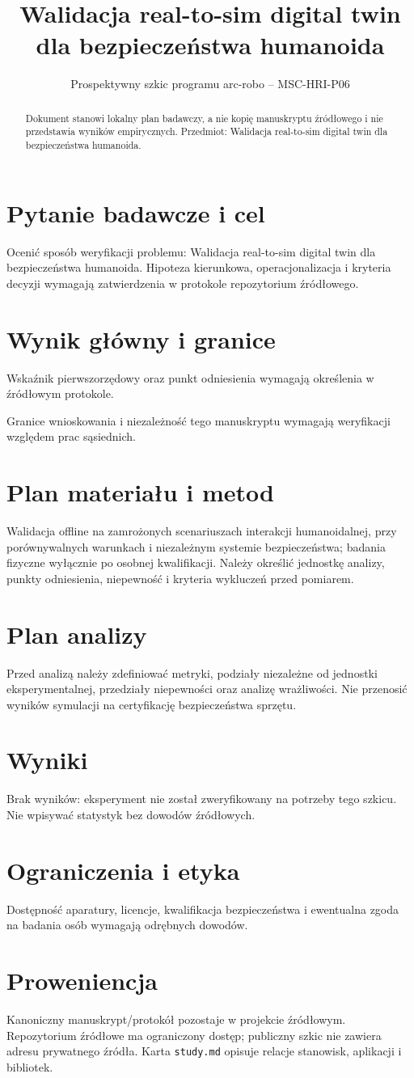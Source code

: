 \documentclass[11pt,a4paper]{article}
\title{Walidacja real-to-sim digital twin dla bezpieczeństwa humanoida}
\author{}
\date{Prospektywny szkic programu arc-robo -- MSC-HRI-P06}
\begin{document}
\maketitle
\begin{abstract}
Dokument stanowi lokalny plan badawczy, a nie kopię manuskryptu źródłowego i nie przedstawia wyników empirycznych. Przedmiot: Walidacja real-to-sim digital twin dla bezpieczeństwa humanoida.
\end{abstract}
\section{Pytanie badawcze i cel}
Ocenić sposób weryfikacji problemu: Walidacja real-to-sim digital twin dla bezpieczeństwa humanoida. Hipoteza kierunkowa, operacjonalizacja i kryteria decyzji wymagają zatwierdzenia w protokole repozytorium źródłowego.
\section{Wynik główny i granice}
Wskaźnik pierwszorzędowy oraz punkt odniesienia wymagają określenia w źródłowym protokole.

Granice wnioskowania i niezależność tego manuskryptu wymagają weryfikacji względem prac sąsiednich.
\section{Plan materiału i metod}
Walidacja offline na zamrożonych scenariuszach interakcji humanoidalnej, przy porównywalnych warunkach i niezależnym systemie bezpieczeństwa; badania fizyczne wyłącznie po osobnej kwalifikacji. Należy określić jednostkę analizy, punkty odniesienia, niepewność i kryteria wykluczeń przed pomiarem.
\section{Plan analizy}
Przed analizą należy zdefiniować metryki, podziały niezależne od jednostki eksperymentalnej, przedziały niepewności oraz analizę wrażliwości. Nie przenosić wyników symulacji na certyfikację bezpieczeństwa sprzętu.
\section{Wyniki}
Brak wyników: eksperyment nie został zweryfikowany na potrzeby tego szkicu. Nie wpisywać statystyk bez dowodów źródłowych.
\section{Ograniczenia i etyka}
Dostępność aparatury, licencje, kwalifikacja bezpieczeństwa i ewentualna zgoda na badania osób wymagają odrębnych dowodów.
\section{Proweniencja}
Kanoniczny manuskrypt/protokół pozostaje w projekcie źródłowym. Repozytorium źródłowe ma ograniczony dostęp; publiczny szkic nie zawiera adresu prywatnego źródła. Karta \texttt{study.md} opisuje relacje stanowisk, aplikacji i bibliotek.
\end{document}
